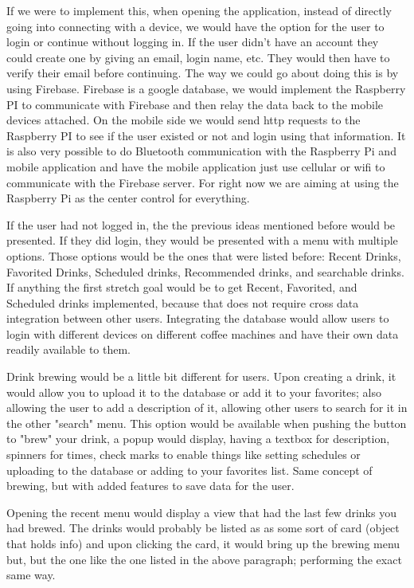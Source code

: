 \documentclass[conference]{IEEEtran}
\begin{document}
\par If we were to implement this, when opening the application, instead of directly going into connecting with a device, we would
have the option for the user to login or continue without logging in. If the user didn't have an account they could create one by
giving an email, login name, etc. They would then have to verify their email before continuing. The way we could go about doing this 
is by using Firebase. Firebase is a google database, we would implement the Raspberry PI to communicate with Firebase and then
relay the data back to the mobile devices attached. On the mobile side we would send http requests to the Raspberry PI to see
if the user existed or not and login using that information. It is also very possible to do Bluetooth communication with the Raspberry Pi
and mobile application and have the mobile application just use cellular or wifi to communicate with the Firebase server. For right
now we are aiming at using the Raspberry Pi as the center control for everything.

\par If the user had not logged in, the the previous ideas mentioned before would be presented. If they did login, they would be 
presented with a menu with multiple options. Those options would be the ones that were listed before: Recent Drinks, Favorited Drinks,
Scheduled drinks, Recommended drinks, and searchable drinks. If anything the first stretch goal would be to get Recent, Favorited, and Scheduled
drinks implemented, because that does not require cross data integration between other users. Integrating the database would allow users to login
with different devices on different coffee machines and have their own data readily available to them.

\par Drink brewing would be a little bit different for users. Upon creating a drink, it would allow you to upload it to the database or add it to your favorites; also allowing the user to  add a description of it,
allowing other users to search for it in the other "search" menu. This option would be available when pushing the button to "brew" your drink, a popup would display, having a textbox for description, spinners
for times, check marks to enable things like setting schedules or uploading to the database or adding to your favorites list. Same concept of brewing, but with added features to save data for the user.

\par Opening the recent menu would display a view that had the last few drinks you had brewed. The drinks would probably be listed as as some sort of card (object that holds info) and
upon clicking the card, it would bring up the brewing menu but, but the one like the one listed in the above paragraph; performing the exact same way.
\end{document}
